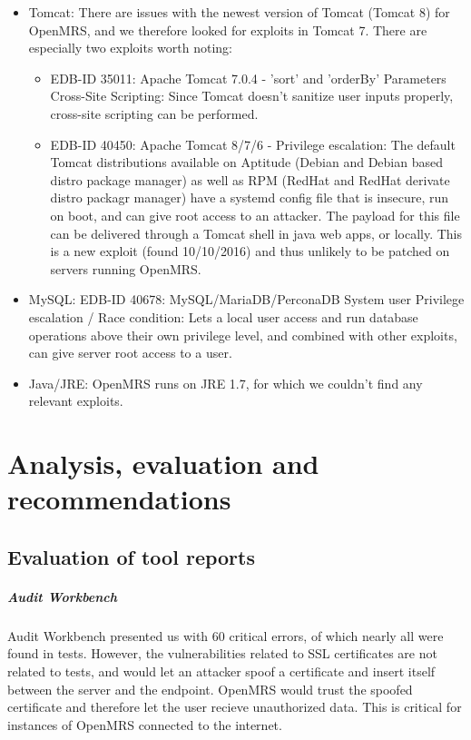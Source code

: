 \documentclass{report} %
\begin{document}
\begin{itemize}
\item Tomcat: There are issues with the newest version of Tomcat (Tomcat 8) for
  OpenMRS, and we therefore looked for exploits in Tomcat 7. There are
  especially two exploits worth noting:
  \begin{itemize}
    \item EDB-ID 35011: Apache Tomcat 7.0.4 - 'sort' and 'orderBy' Parameters Cross-Site Scripting:
      Since Tomcat doesn't sanitize user inputs properly, cross-site scripting
      can be performed.
    \item EDB-ID 40450: Apache Tomcat 8/7/6 - Privilege escalation: The default
      Tomcat distributions available on Aptitude (Debian and Debian based distro
      package manager) as well as RPM (RedHat and RedHat derivate distro packagr
      manager) have a systemd config file that is insecure, run on boot, and can give
      root access to an attacker. The payload for this file can be delivered
      through a Tomcat shell in java web apps, or locally. This is a new exploit
      (found 10/10/2016) and thus unlikely to be patched on servers running OpenMRS.
  \end{itemize}
\item MySQL: EDB-ID 40678: MySQL/MariaDB/PerconaDB System user Privilege
  escalation / Race condition:
  Lets a local user access and run database operations above their own privilege
  level, and combined with other exploits, can give server root access to a user.
  
\item Java/JRE: OpenMRS runs on JRE 1.7, for which we couldn't find any relevant exploits.
\end{itemize}\autocite[]{exploitdb}

\chapter{Analysis, evaluation and recommendations}  
\section{Evaluation of tool reports}
\paragraph{Audit Workbench}
Audit Workbench presented us with 60 critical errors, of which nearly all were
found in tests. However, the vulnerabilities related to SSL certificates are not
related to tests, and would let an attacker spoof a certificate and insert
itself between the server and the endpoint. OpenMRS would trust the spoofed
certificate and therefore let the user recieve unauthorized data. This is
critical for instances of OpenMRS connected to the internet.
\end{document}
